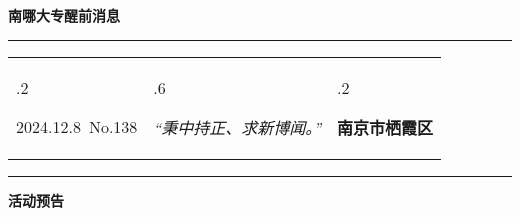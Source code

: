 \documentclass[letterpaper, 12pt]{article}
\begin{document}
\begin{center}
    \Huge\textbf{南哪大专醒前消息}
\end{center}
\vspace{4mm}
\hrule
\renewcommand\tabularxcolumn[1]{m{#1}}
\begin{tabularx}{\textwidth}{>{\hsize.2\hsize}X>{\hsize.6\hsize}X>{\hsize.2\hsize}X}
    \begin{flushleft}
        2024.12.8\, No.138
    \end{flushleft}
    &
    \begin{center}
        \textit{“秉中持正、求新博闻。”}
    \end{center}
    &
    \begin{flushright}
        \textbf{南京市栖霞区}
    \end{flushright}
\end{tabularx}
\vspace{-3.5mm}
\hrule
\vspace{4mm}
\centerline{\huge\textbf{活动预告}}
\end{document}
